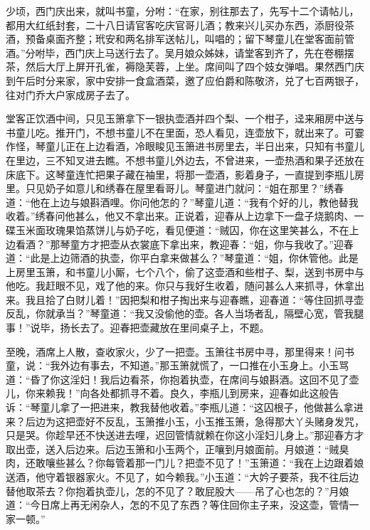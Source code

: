 少顷，西门庆出来，就叫书童，分咐：“在家，别往那去了，先写十二个请帖儿，都用大红纸封套，二十八日请官客吃庆官哥儿酒；教来兴儿买办东西，添厨役茶酒，预备桌面齐整；玳安和两名排军送帖儿，叫唱的；留下琴童儿在堂客面前管酒。”分咐毕，西门庆上马送行去了。吴月娘众姊妹，请堂客到齐了，先在卷棚摆茶，然后大厅上屏开孔雀，褥隐芙蓉，上坐。席间叫了四个妓女弹唱。果然西门庆到午后时分来家，家中安排一食盒酒菜，邀了应伯爵和陈敬济，兑了七百两银子，往对门乔大户家成房子去了。

堂客正饮酒中间，只见玉箫拿下一银执壶酒并四个梨、一个柑子，迳来厢房中送与书童儿吃。推开门，不想书童儿不在里面，恐人看见，连壶放下，就出来了。可霎作怪，琴童儿正在上边看酒，冷眼睃见玉箫进书房里去，半日出来，只知有书童儿在里边，三不知叉进去瞧。不想书童儿外边去，不曾进来，一壶热酒和果子还放在床底下。这琴童连忙把果子藏在袖里，将那一壶酒，影着身子，一直提到李瓶儿房里。只见奶子如意儿和绣春在屋里看哥儿。琴童进门就问：“姐在那里？”绣春道：“他在上边与娘斟酒哩。你问他怎的？”琴童儿道：“我有个好的儿，教他替我收着。”绣春问他甚么，他又不拿出来。正说着，迎春从上边拿下一盘子烧鹅肉、一碟玉米面玫瑰果馅蒸饼儿与奶子吃，看见便道：“贼囚，你在这里笑甚么，不在上边看酒？”那琴童方才把壶从衣裳底下拿出来，教迎春：“姐，你与我收了。”迎春道：“此是上边筛酒的执壶，你平白拿来做甚么？”琴童道：“姐，你休管他。此是上房里玉箫，和书童儿小厮，七个八个，偷了这壶酒和些柑子、梨，送到书房中与他吃。我赶眼不见，戏了他的来。你只与我好生收着，随问甚么人来抓寻，休拿出来。我且拾了白财儿着！”因把梨和柑子掏出来与迎春瞧，迎春道：“等住回抓寻壶反乱，你就承当？”琴童道：“我又没偷他的壶。各人当场者乱，隔壁心宽，管我腿事！”说毕，扬长去了。迎春把壶藏放在里间桌子上，不题。

至晚，酒席上人散，查收家火，少了一把壶。玉箫往书房中寻，那里得来！问书童，说：“我外边有事去，不知道。”那玉箫就慌了，一口推在小玉身上。小玉骂道：“昏了你这淫妇！我后边看茶，你抱着执壶，在席间与娘斟酒。这回不见了壶儿，你来赖我！”向各处都抓寻不着。良久，李瓶儿到房来，迎春如此这般告诉：“琴童儿拿了一把进来，教我替他收着。”李瓶儿道：“这囚根子，他做甚么拿进来？后边为这把壶好不反乱，玉箫推小玉，小玉推玉箫，急得那大丫头赌身发咒，只是哭。你趁早还不快送进去哩，迟回管情就赖在你这小淫妇儿身上。”那迎春方才取出壶，送入后边来。后边玉箫和小玉两个，正嚷到月娘面前。月娘道：“贼臭肉，还敢嚷些甚么？你每管着那一门儿？把壶不见了！”玉箫道：“我在上边跟着娘送酒，他守着银器家火。不见了，如今赖我。”小玉道：“大妗子要茶，我不往后边替他取茶去？你抱着执壶儿，怎的不见了？敢屁股大——吊了心也怎的？”月娘道：“今日席上再无闲杂人，怎的不见了东西？等住回你主子来，没这壶，管情一家一顿。”

